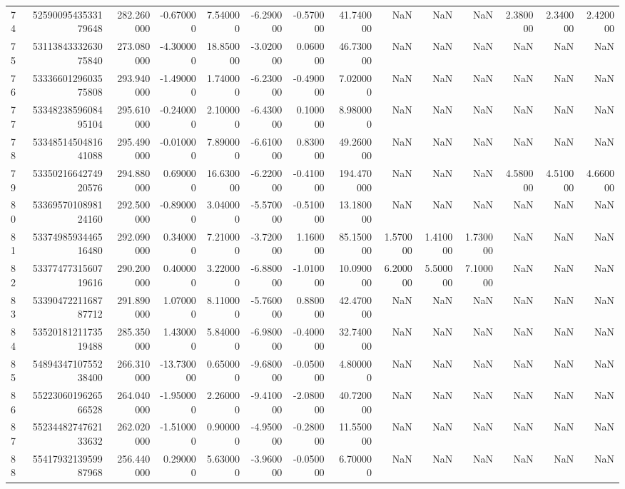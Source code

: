 \begin{tabular}{lrrrrrrrrrrrrr}
74 & 5259009543533179648 & 282.260000 & -0.670000 & 7.540000 & -6.290000 & -0.570000 & 41.740000 & NaN & NaN & NaN & 2.380000 & 2.340000 & 2.420000 \\
75 & 5311384333263075840 & 273.080000 & -4.300000 & 18.850000 & -3.020000 & 0.060000 & 46.730000 & NaN & NaN & NaN & NaN & NaN & NaN \\
76 & 5333660129603575808 & 293.940000 & -1.490000 & 1.740000 & -6.230000 & -0.490000 & 7.020000 & NaN & NaN & NaN & NaN & NaN & NaN \\
77 & 5334823859608495104 & 295.610000 & -0.240000 & 2.100000 & -6.430000 & 0.100000 & 8.980000 & NaN & NaN & NaN & NaN & NaN & NaN \\
78 & 5334851450481641088 & 295.490000 & -0.010000 & 7.890000 & -6.610000 & 0.830000 & 49.260000 & NaN & NaN & NaN & NaN & NaN & NaN \\
79 & 5335021664274920576 & 294.880000 & 0.690000 & 16.630000 & -6.220000 & -0.410000 & 194.470000 & NaN & NaN & NaN & 4.580000 & 4.510000 & 4.660000 \\
80 & 5336957010898124160 & 292.500000 & -0.890000 & 3.040000 & -5.570000 & -0.510000 & 13.180000 & NaN & NaN & NaN & NaN & NaN & NaN \\
81 & 5337498593446516480 & 292.090000 & 0.340000 & 7.210000 & -3.720000 & 1.160000 & 85.150000 & 1.570000 & 1.410000 & 1.730000 & NaN & NaN & NaN \\
82 & 5337747731560719616 & 290.200000 & 0.400000 & 3.220000 & -6.880000 & -1.010000 & 10.090000 & 6.200000 & 5.500000 & 7.100000 & NaN & NaN & NaN \\
83 & 5339047221168787712 & 291.890000 & 1.070000 & 8.110000 & -5.760000 & 0.880000 & 42.470000 & NaN & NaN & NaN & NaN & NaN & NaN \\
84 & 5352018121173519488 & 285.350000 & 1.430000 & 5.840000 & -6.980000 & -0.400000 & 32.740000 & NaN & NaN & NaN & NaN & NaN & NaN \\
85 & 5489434710755238400 & 266.310000 & -13.730000 & 0.650000 & -9.680000 & -0.050000 & 4.800000 & NaN & NaN & NaN & NaN & NaN & NaN \\
86 & 5522306019626566528 & 264.040000 & -1.950000 & 2.260000 & -9.410000 & -2.080000 & 40.720000 & NaN & NaN & NaN & NaN & NaN & NaN \\
87 & 5523448274762133632 & 262.020000 & -1.510000 & 0.900000 & -4.950000 & -0.280000 & 11.550000 & NaN & NaN & NaN & NaN & NaN & NaN \\
88 & 5541793213959987968 & 256.440000 & 0.290000 & 5.630000 & -3.960000 & -0.050000 & 6.700000 & NaN & NaN & NaN & NaN & NaN & NaN \\

\end{tabular}

